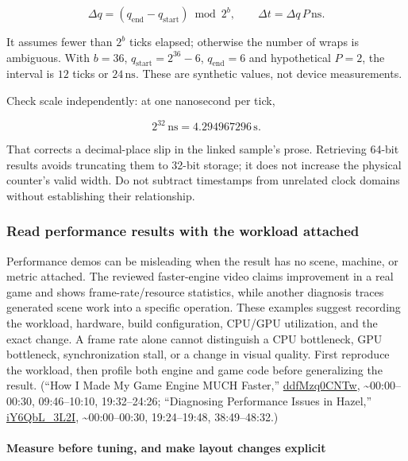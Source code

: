 \[
\Delta q=(q_{\mathrm{end}}-q_{\mathrm{start}})\bmod2^b,
\qquad
\Delta t=\Delta q\,P\,\mathrm{ns}.
\]

It assumes fewer than \(2^b\) ticks elapsed; otherwise the number of wraps is ambiguous. With \(b=36\), \(q_{\mathrm{start}}=2^{36}-6\), \(q_{\mathrm{end}}=6\) and hypothetical \(P=2\), the interval is \(12\) ticks or \(24\,\mathrm{ns}\). These are synthetic values, not device measurements.

Check scale independently: at one nanosecond per tick,

\[2^{32}\,\mathrm{ns}=4.294967296\,\mathrm{s}.\]

That corrects a decimal-place slip in the linked sample's prose. Retrieving 64-bit results avoids truncating them to 32-bit storage; it does not increase the physical counter's valid width. Do not subtract timestamps from unrelated clock domains without establishing their relationship.

\subsubsection{Read performance results with the workload attached}\label{read-performance-results-with-the-workload-attached}

Performance demos can be misleading when the result has no scene, machine, or metric attached. The reviewed faster-engine video claims improvement in a real game and shows frame-rate/resource statistics, while another diagnosis traces generated scene work into a specific operation. These examples suggest recording the workload, hardware, build configuration, CPU/GPU utilization, and the exact change. A frame rate alone cannot distinguish a CPU bottleneck, GPU bottleneck, synchronization stall, or a change in visual quality. First reproduce the workload, then profile both engine and game code before generalizing the result. (``How I Made My Game Engine MUCH Faster,'' \href{https://www.youtube.com/watch?v=ddfMzq0CNTw}{ddfMzq0CNTw}, \textasciitilde00:00--00:30, 09:46--10:10, 19:32--24:26; ``Diagnosing Performance Issues in Hazel,'' \href{https://www.youtube.com/watch?v=iY6QbL_3L2I}{iY6QbL\_3L2I}, \textasciitilde00:00--00:30, 19:24--19:48, 38:49--48:32.)

\paragraph{Measure before tuning, and make layout changes explicit}\label{measure-before-tuning-and-make-layout-changes-explicit}

